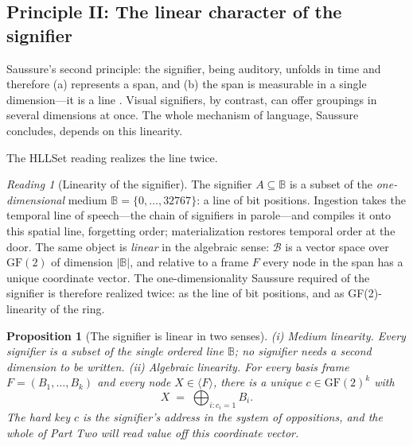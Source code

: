 \documentclass[11pt,a4paper]{article}
\newtheorem{proposition}[principle]{Proposition}
\theoremstyle{remark}
\newtheorem{reading}[principle]{Reading}
\newcommand{\Plane}{\ensuremath{\mathbb{B}}}            %
\newcommand{\Lat}{\ensuremath{\mathcal{B}}}              %
\newcommand{\spanof}[1]{\ensuremath{\langle #1\rangle}}  %
\begin{document}
\subsection{Principle II: The linear character of the signifier}
\label{sec:linearity}

Saussure's second principle: the signifier, being auditory, unfolds in time and
therefore (a) represents a span, and (b) the span is measurable in a single
dimension---it is a line \cite[Part I, ch.~I, \S3]{harris1983}. Visual
signifiers, by contrast, can offer groupings in several dimensions at once.
The whole mechanism of language, Saussure concludes, depends on this
linearity.

The HLLSet reading realizes the line twice.

\begin{reading}[Linearity of the signifier]
\label{read:linearity}
The signifier $A \subseteq \Plane$ is a subset of the \emph{one-dimensional}
medium $\Plane = \{0,\dots,32767\}$: a line of bit positions. Ingestion takes
the temporal line of speech---the chain of signifiers in parole---and compiles
it onto this spatial line, forgetting order; materialization restores temporal
order at the door. The same object is \emph{linear} in the algebraic sense:
$\Lat$ is a vector space over $\mathrm{GF}(2)$ of dimension $|\Plane|$, and
relative to a frame $F$ every node in the span has a unique coordinate vector.
The one-dimensionality Saussure required of the signifier is therefore
realized twice: as the line of bit positions, and as GF(2)-linearity of the
ring.
\end{reading}

\begin{proposition}[The signifier is linear in two senses]
\label{prop:linearity}
(i) \emph{Medium linearity.} Every signifier is a subset of the single ordered
line $\Plane$; no signifier needs a second dimension to be written. (ii)
\emph{Algebraic linearity.} For every basis frame $F=(B_1,\dots,B_k)$ and every
node $X \in \spanof{F}$, there is a unique $c \in \mathrm{GF}(2)^k$ with
\[
  X \;=\; \bigoplus_{i : c_i = 1} B_i.
\]
The hard key $c$ is the signifier's address in the system of oppositions, and
the whole of Part Two will read value off this coordinate vector.
\end{proposition}
\end{document}
